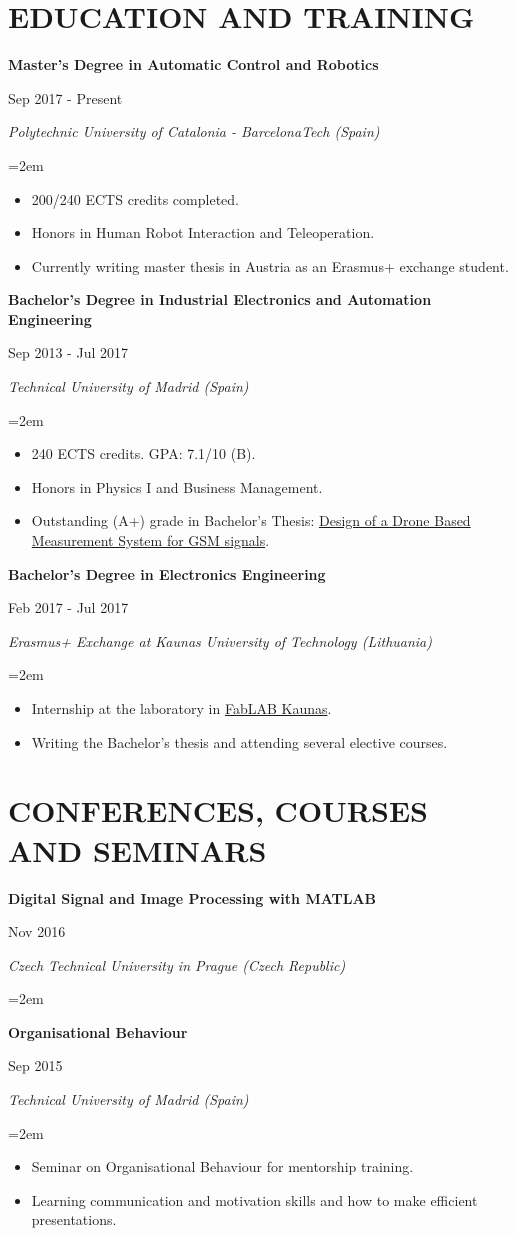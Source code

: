 \documentclass[10pt,a4paper,oneside]{book}
\newcommand{\sepspace}{\vspace*{0pt}}		%
\newcommand{\NewPart}[2]{\section*{\uppercase{#1} #2}}
\newcommand{\EducationEntrya}[4]{\noindent\ignorespaces	
		\begin{minipage}[t][][b]{0.8\textwidth} \raggedright{\textbf{#1}} \end{minipage} \hfill 
		\begin{minipage}[t][][b]{0.2\textwidth} \hfill\color{Black}#2 \end{minipage} 
		 
		\noindent \textit{#3} \par        %
		\noindent\hangindent=2em\hangafter=0 \small #4 
		\normalsize \par}
\begin{document}
\NewPart{Education and training}{}

\EducationEntrya{Master’s Degree in Automatic Control and Robotics }{Sep 2017 - Present}{Polytechnic University of Catalonia - BarcelonaTech (Spain)}{\begin{itemize}
\item 200/240 ECTS credits completed.
\item Honors in Human Robot Interaction and Teleoperation.
\item Currently writing master thesis in Austria as an Erasmus+ exchange student.
\end{itemize}}

\sepspace
\EducationEntrya{Bachelor's Degree in Industrial Electronics and Automation Engineering
\\}{Sep 2013 - Jul 2017}{Technical University of Madrid (Spain)}{\begin{itemize} \item 240 ECTS credits. GPA: 7.1/10 (B). \item Honors in Physics I and Business Management. \item Outstanding (A+) grade in Bachelor's Thesis: \href{https://drive.google.com/file/d/0BxCxXmj96TUnZFdvaTduZUxCazQ/view?usp=sharing}{Design of a Drone Based  Measurement System for GSM signals}.\end{itemize}}
\sepspace

\EducationEntrya{Bachelor's Degree in Electronics Engineering}{Feb 2017 - Jul 2017}{Erasmus+ Exchange at Kaunas University of Technology (Lithuania)}{\begin{itemize}\item Internship at the laboratory in \href{https://fablabkaunas.lt/}{FabLAB Kaunas}. \item Writing the Bachelor's thesis and attending several elective courses. \end{itemize}}
\sepspace

\NewPart{Conferences, courses and seminars}{}
\EducationEntrya{Digital Signal and Image Processing with MATLAB}{Nov 2016}{Czech Technical University in Prague (Czech Republic)}{}
\EducationEntrya{Organisational Behaviour}{Sep 2015}{Technical University of Madrid (Spain)}{\begin{itemize}\item Seminar on Organisational Behaviour for mentorship training.
\item Learning communication and motivation skills and how to make efficient presentations. \end{itemize}}
\end{document}
